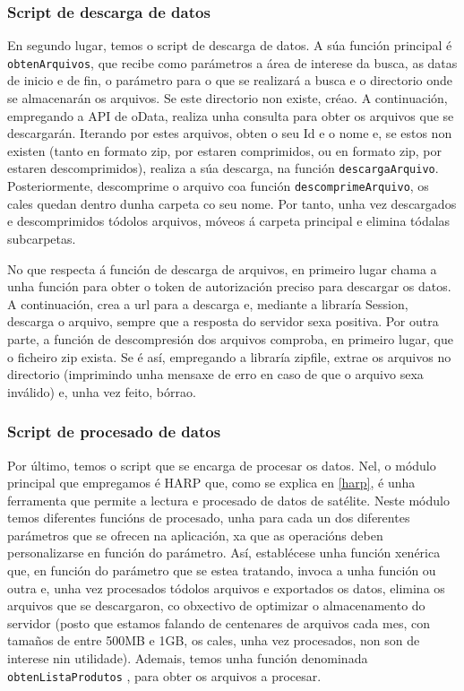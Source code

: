 \subsubsection{Script de descarga de datos}\label{descarga}
En segundo lugar, temos o script de descarga de datos. A súa función principal é \texttt{obtenArquivos}, que recibe como parámetros a área de interese da busca, as datas de inicio e de fin, o parámetro
para o que se realizará a busca e o directorio onde se almacenarán os arquivos. Se este directorio non existe, créao. A continuación, empregando a API de oData, realiza unha consulta para obter os
arquivos que se descargarán. Iterando por estes arquivos, obten o seu Id e o nome e, se estos non existen (tanto en formato zip, por estaren comprimidos, ou en formato zip, por estaren
descomprimidos), realiza a súa descarga, na función \texttt{descargaArquivo}. Posteriormente, descomprime o arquivo coa función \texttt{descomprimeArquivo}, os cales quedan dentro dunha carpeta co seu
nome. Por tanto, unha vez descargados e descomprimidos tódolos arquivos, móveos á carpeta principal e elimina tódalas subcarpetas.

No que respecta á función de descarga de arquivos, en primeiro lugar chama a unha función para obter o token de autorización preciso para descargar os datos. A continuación, crea a url para a
descarga e, mediante a libraría Session, descarga o arquivo, sempre que a resposta do servidor sexa positiva. Por outra parte, a función de descompresión dos arquivos comproba, en primeiro lugar,
que o ficheiro zip exista. Se é así, empregando a libraría zipfile, extrae os arquivos no directorio (imprimindo unha mensaxe de erro en caso de que o arquivo sexa inválido) e, unha vez feito, bórrao.

\subsubsection{Script de procesado de datos}\label{procesado}
Por último, temos o script que se encarga de procesar os datos. Nel, o módulo principal que empregamos é HARP que, como se explica en \ref{harp}, é unha ferramenta que permite a
lectura e procesado de datos de satélite. Neste módulo temos diferentes funcións de procesado, unha para cada un dos diferentes parámetros que se ofrecen na aplicación, xa que as
operacións deben personalizarse en función do parámetro. Así, establécese unha función xenérica que, en función do parámetro que se estea tratando, invoca a unha función ou outra e,
unha vez procesados tódolos arquivos e exportados os datos, elimina os arquivos que se descargaron, co obxectivo de optimizar o almacenamento do servidor (posto que estamos falando de
centenares de arquivos cada mes, con tamaños de entre 500MB e 1GB, os cales, unha vez procesados, non son de interese nin utilidade). Ademais, temos unha función denominada \texttt{obtenListaProdutos}
, para obter os arquivos a procesar.

